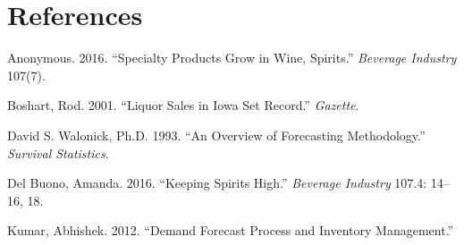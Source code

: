 \documentclass[]{elsarticle} %
\begin{document}
\section*{References}\label{references}

\hypertarget{refs}{}
\hypertarget{ref-SpecialityGrow3}{}
Anonymous. 2016. ``Specialty Products Grow in Wine, Spirits.''
\emph{Beverage Industry} 107(7).

\hypertarget{ref-IowaSetsRecord2}{}
Boshart, Rod. 2001. ``Liquor Sales in Iowa Set Record.'' \emph{Gazette}.

\hypertarget{ref-Forecast1}{}
David S. Walonick, Ph.D. 1993. ``An Overview of Forecasting
Methodology.'' \emph{Survival Statistics}.

\hypertarget{ref-KeepingSpiritsHigh1}{}
Del Buono, Amanda. 2016. ``Keeping Spirits High.'' \emph{Beverage
Industry} 107.4: 14--16, 18.

\hypertarget{ref-Demand1}{}
Kumar, Abhishek. 2012. ``Demand Forecast Process and Inventory
Management.''
\end{document}
